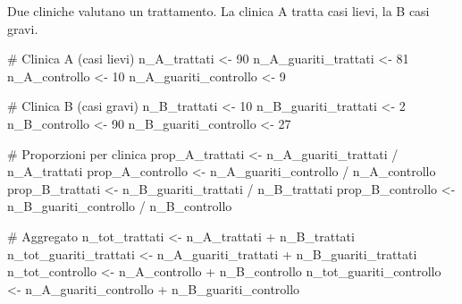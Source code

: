 \documentclass[
  italian,
  letterpaper,
  a4paper,
  11pt,
  open=any]{scrbook}
\newenvironment{Shaded}{\begin{snugshade}}{\end{snugshade}}
\newcommand{\CommentTok}[1]{\textcolor[rgb]{0.37,0.37,0.37}{#1}}
\newcommand{\DecValTok}[1]{\textcolor[rgb]{0.68,0.00,0.00}{#1}}
\newcommand{\NormalTok}[1]{\textcolor[rgb]{0.00,0.23,0.31}{#1}}
\newcommand{\OtherTok}[1]{\textcolor[rgb]{0.00,0.23,0.31}{#1}}
\newcommand{\SpecialCharTok}[1]{\textcolor[rgb]{0.37,0.37,0.37}{#1}}
\theoremstyle{plain}
\theoremstyle{definition}
\theoremstyle{definition}
\theoremstyle{remark}
\begin{document}
\begin{tcolorbox}[enhanced jigsaw, arc=.35mm, bottomrule=.15mm, bottomtitle=1mm, breakable, colback=white, colbacktitle=quarto-callout-note-color!10!white, colframe=quarto-callout-note-color-frame, coltitle=black, left=2mm, leftrule=.75mm, opacityback=0, opacitybacktitle=0.6, rightrule=.15mm, title=\textcolor{quarto-callout-note-color}{\faInfo}\hspace{0.5em}{Esempio: efficacia di un trattamento per la depressione}, titlerule=0mm, toprule=.15mm, toptitle=1mm]

Due cliniche valutano un trattamento. La clinica A tratta casi lievi, la
B casi gravi.

\begin{Shaded}
\begin{Highlighting}[]
\CommentTok{\# Clinica A (casi lievi)}
\NormalTok{n\_A\_trattati }\OtherTok{\textless{}{-}} \DecValTok{90}
\NormalTok{n\_A\_guariti\_trattati }\OtherTok{\textless{}{-}} \DecValTok{81}
\NormalTok{n\_A\_controllo }\OtherTok{\textless{}{-}} \DecValTok{10}
\NormalTok{n\_A\_guariti\_controllo }\OtherTok{\textless{}{-}} \DecValTok{9}

\CommentTok{\# Clinica B (casi gravi)}
\NormalTok{n\_B\_trattati }\OtherTok{\textless{}{-}} \DecValTok{10}
\NormalTok{n\_B\_guariti\_trattati }\OtherTok{\textless{}{-}} \DecValTok{2}
\NormalTok{n\_B\_controllo }\OtherTok{\textless{}{-}} \DecValTok{90}
\NormalTok{n\_B\_guariti\_controllo }\OtherTok{\textless{}{-}} \DecValTok{27}

\CommentTok{\# Proporzioni per clinica}
\NormalTok{prop\_A\_trattati }\OtherTok{\textless{}{-}}\NormalTok{ n\_A\_guariti\_trattati }\SpecialCharTok{/}\NormalTok{ n\_A\_trattati}
\NormalTok{prop\_A\_controllo }\OtherTok{\textless{}{-}}\NormalTok{ n\_A\_guariti\_controllo }\SpecialCharTok{/}\NormalTok{ n\_A\_controllo}
\NormalTok{prop\_B\_trattati }\OtherTok{\textless{}{-}}\NormalTok{ n\_B\_guariti\_trattati }\SpecialCharTok{/}\NormalTok{ n\_B\_trattati}
\NormalTok{prop\_B\_controllo }\OtherTok{\textless{}{-}}\NormalTok{ n\_B\_guariti\_controllo }\SpecialCharTok{/}\NormalTok{ n\_B\_controllo}

\CommentTok{\# Aggregato}
\NormalTok{n\_tot\_trattati }\OtherTok{\textless{}{-}}\NormalTok{ n\_A\_trattati }\SpecialCharTok{+}\NormalTok{ n\_B\_trattati}
\NormalTok{n\_tot\_guariti\_trattati }\OtherTok{\textless{}{-}}\NormalTok{ n\_A\_guariti\_trattati }\SpecialCharTok{+}\NormalTok{ n\_B\_guariti\_trattati}
\NormalTok{n\_tot\_controllo }\OtherTok{\textless{}{-}}\NormalTok{ n\_A\_controllo }\SpecialCharTok{+}\NormalTok{ n\_B\_controllo}
\NormalTok{n\_tot\_guariti\_controllo }\OtherTok{\textless{}{-}}\NormalTok{ n\_A\_guariti\_controllo }\SpecialCharTok{+}\NormalTok{ n\_B\_guariti\_controllo}


\end{Highlighting}
\end{Shaded}
\end{tcolorbox}
\end{document}
